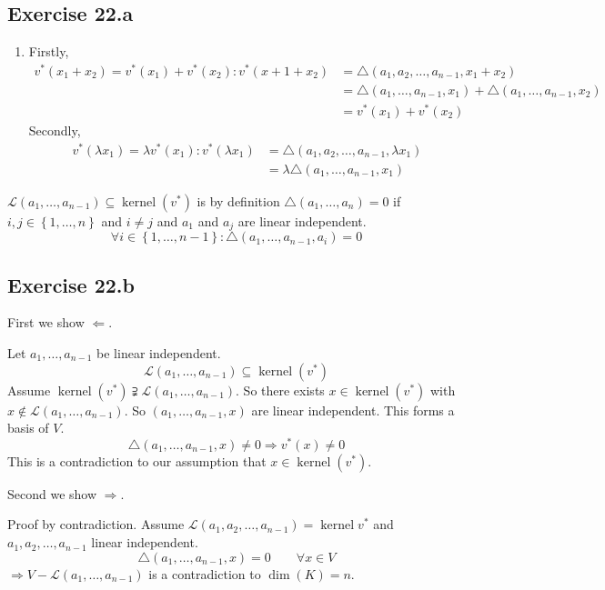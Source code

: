 \documentclass[a4paper]{article}
\theoremstyle{definition}
\DeclareMathOperator\kernel{kernel}
\newcommand\set[1]{\left\{#1\right\}}
\begin{document}
\subsection{Exercise 22.a}
\begin{enumerate}
  \item
    Firstly,
    \begin{align*}
      v^*(x_1 + x_2) = v^*(x_1) + v^*(x_2): v^*(x+1 + x_2)
      &= \triangle(a_1, a_2, \ldots, a_{n-1}, x_1 + x_2) \\
      &= \triangle(a_1, \ldots, a_{n-1}, x_1) + \triangle(a_1, \ldots, a_{n-1}, x_2) \\
      &= v^*(x_1) + v^*(x_2)
    \end{align*}
    Secondly,
    \begin{align*}
      v^*(\lambda x_1) = \lambda v^*(x_1): v^*(\lambda x_1)
      &= \triangle(a_1, a_2, \ldots, a_{n-1}, \lambda x_1) \\
      &= \lambda \triangle(a_1, \ldots, a_{n-1}, x_1)
    \end{align*}
\end{enumerate}

$\mathcal{L}(a_1, \ldots, a_{n-1}) \subseteq \kernel(v^*)$ is by definition $\triangle(a_1, \ldots, a_n) = 0$
if $i,j \in \set{1,\ldots,n}$ and $i \neq j$ and $a_1$ and $a_j$ are linear independent.
\[ \forall i \in \set{1, \ldots, n-1}: \triangle(a_1, \ldots, a_{n-1}, a_i) = 0 \]

\subsection{Exercise 22.b}
First we show $\Leftarrow$.

Let $a_1, \ldots, a_{n-1}$ be linear independent.
\[ \mathcal L(a_1, \ldots, a_{n-1}) \subseteq \kernel(v^*) \]
Assume $\kernel(v^*) \supsetneqq \mathcal L(a_1, \ldots, a_{n-1})$.
So there exists $x \in \kernel(v^*)$ with $x \not\in \mathcal L(a_1, \ldots, a_{n-1})$.
So $(a_1, \ldots, a_{n-1}, x)$ are linear independent.
This forms a basis of $V$.
\[ \triangle(a_1, \ldots, a_{n-1}, x) \neq 0 \Rightarrow v^*(x) \neq 0 \]
This is a contradiction to our assumption that $x \in \kernel(v^*)$.

Second we show $\Rightarrow$.

Proof by contradiction. Assume $\mathcal L(a_1, a_2, \ldots, a_{n-1}) = \kernel{v^*}$
and $a_1, a_2, \ldots, a_{n-1}$ linear independent.
\[
  \triangle (a_1, \ldots, a_{n-1}, x) = 0
  \qquad \forall x \in V
\]
$\Rightarrow V - \mathcal L(a_1, \ldots, a_{n-1})$ is a contradiction to $\dim(K) = n$.
\end{document}
